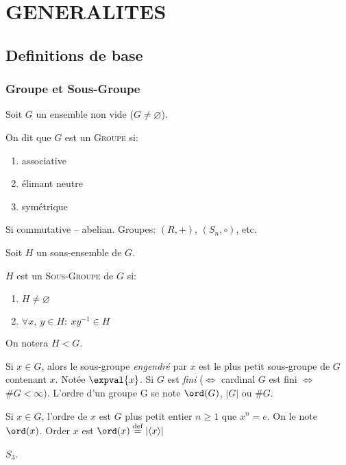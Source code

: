 \chapter{GENERALITES} %
\label{cha:generalites}

\section{Definitions de base}
\subsection{Groupe et Sous-Groupe} %
\label{sub:groupe_et_sous_groupe}

Soit $G$ un ensemble non vide ($G\neq\varnothing$).
\begin{definition}
	On dit que $G$ est un \textsc{Groupe} si:
	\begin{enumerate}
		\item associative 
		\item élimant neutre
		\item symétrique
	\end{enumerate}
\end{definition}

Si commutative -- abelian. Groupes: $(R, +)$, $(S_n, \circ)$, etc.

Soit $H$ un sons-ensemble de $G$.
\begin{definition}
	$H$ est un \textsc{Sous-Groupe} de $G$ si:
	\begin{enumerate}
		\item $H\neq\varnothing$
		\item $\forall x,\ y \in H:\ xy^{-1}\in H$
	\end{enumerate}
	On notera $H < G$.
\end{definition}

Si $x\in G$, alors le sous-groupe \emph{engendré} par $x$ est le plus petit sous-groupe de $G$ contenant $x$. Notée $\expval{x}$. Si $G$ est \emph{fini} ($\Leftrightarrow$ cardinal $G$ est fini $\Leftrightarrow$ $\#G<\infty$).  L'ordre d'un groupe G se note $\ord(G)$, $|G|$ ou $\#G$.

Si  $x\in G$, l'ordre de $x$ est $G$ plus petit entier $n\geq 1$ que $x^n = e$. On le note $\ord(x)$. Order $x$ est $\ord(x)\overset{\text{def}}{=}|\langle x\rangle|$

\begin{examplebox}
	$S_3$.
\end{examplebox}

